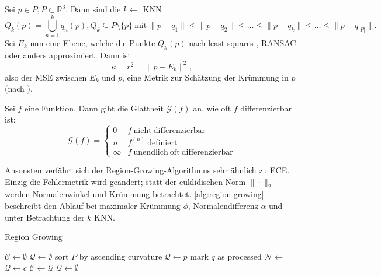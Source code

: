 \begin{definition}
Sei $p \in P, P \subset \mathbb{R}^3$.
Dann sind die $k \gets$ \ac{KNN}
$$
Q_k(p) = \bigcup\limits_{n=1}^{k} q_n(p), Q_k \subseteq P \setminus \{p\}\ 
\mathrm{mit}\ 
\|p - q_1\| \leq \|p - q_2\| \leq \dotsc \leq \|p - q_k\| \leq \dotsc \leq \|p - q_{|P|}\|.
$$
Sei $E_k$ nun eine Ebene, welche die Punkte $Q_k(p)$ nach least squares \cite{schomaker1959fit}, RANSAC \cite{fischler1981random} oder anders approximiert.
Dann ist
\begin{equation}
\label{eq:kruemmung}
\kappa = r^2 = \|p - E_k\|^2,
\end{equation}
also der \ac{MSE} zwischen $E_k$ und $p$, eine Metrik zur Schätzung der Krümmung in $p$ (nach \cite[Abs. 2.1.2]{rabbani2006segmentation}).
\end{definition}

\begin{definition}
\label{def:glattheit}
Sei $f$ eine Funktion.
Dann gibt die Glattheit $\mathcal{G}(f)$ an, wie oft $f$ differenzierbar ist:
\begin{equation}
\mathcal{G}(f) = \left\{\begin{array}{ll}
0 & f\ \mathrm{nicht\ differenzierbar}\\
n & f^{(n)}\ \mathrm{definiert}\\
\infty & f\ \mathrm{unendlich\ oft\ differenzierbar}
\end{array}\right.
\end{equation}
\end{definition}

Ansonsten verfährt sich der Region-Growing-Algorithmus sehr ähnlich zu \ac{ECE}.
Einzig die Fehlermetrik wird geändert; statt der euklidischen Norm $\|\cdot\|_2$ werden Normalenwinkel und Krümmung betrachtet.
\autoref{alg:region-growing} beschreibt den Ablauf bei maximaler Krümmung $\phi$, Normalendifferenz $\alpha$ und unter Betrachtung der $k$ \ac{KNN}.

\begin{algorithm}
\caption{Region Growing}
\label{alg:region-growing}
\begin{algorithmic}
\State $\mathcal{C} \gets \emptyset$
\State $\mathcal{Q} \gets \emptyset$
\State sort $P$ by ascending curvature
\ForAll{$p \in P$}
	\State $\mathcal{Q} \gets p$
		\State mark $q$ as processed
		\State $\mathcal{N} \gets$ 
				\State $\mathcal{Q} \gets c$
			\EndIf
		\EndFor
	\EndFor
	\State $\mathcal{C} \gets \mathcal{Q}$
	\State $\mathcal{Q} \gets \emptyset$
	\Comment{reset the queue}
\EndFor
\State {}
\end{algorithmic}
\end{algorithm}


